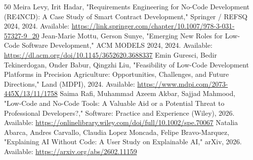 \documentclass[conference]{IEEEtran}
\begin{document}
\begin{thebibliography}{50}
 Meira Levy, Irit Hadar, "Requirements Engineering for No-Code Development (RE4NCD): A Case Study of Smart Contract Development," Springer / REFSQ 2024, 2024. Available: \url{https://link.springer.com/chapter/10.1007/978-3-031-57327-9_20}
 Jean-Marie Mottu, Gerson Sunye, "Emerging New Roles for Low-Code Software Development," ACM MODELS 2024, 2024. Available: \url{https://dl.acm.org/doi/10.1145/3652620.3688337}
 Emin Guresci, Bedir Tekinerdogan, Onder Babur, Qingzhi Liu, "Feasibility of Low-Code Development Platforms in Precision Agriculture: Opportunities, Challenges, and Future Directions," Land (MDPI), 2024. Available: \url{https://www.mdpi.com/2073-445X/13/11/1758}
 Saima Rafi, Muhammad Azeem Akbar, Sajjad Mahmood, "Low-Code and No-Code Tools: A Valuable Aid or a Potential Threat to Professional Developers?," Software: Practice and Experience (Wiley), 2026. Available: \url{https://onlinelibrary.wiley.com/doi/full/10.1002/spe.70067}
 Natalia Abarca, Andres Carvallo, Claudia Lopez Moncada, Felipe Bravo-Marquez, "Explaining AI Without Code: A User Study on Explainable AI," arXiv, 2026. Available: \url{https://arxiv.org/abs/2602.11159}
\end{thebibliography}
\end{document}
